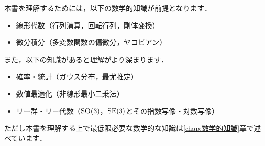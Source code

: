 本書を理解するためには，以下の数学的知識が前提となります．
%
\begin{itemize}
  \item 線形代数（行列演算，回転行列，剛体変換）
  \item 微分積分（多変数関数の偏微分，ヤコビアン）
\end{itemize}
%
また，以下の知識があると理解がより深まります．
%
\begin{itemize}
  \item 確率・統計（ガウス分布，最尤推定）
  \item 数値最適化（非線形最小二乗法）
  \item リー群・リー代数（${\rm SO}(3)$，${\rm SE}(3)$とその指数写像・対数写像）
\end{itemize}
%
ただし本書を理解する上で最低限必要な数学的な知識は\ref{chap:数学的知識}章で述べています．








